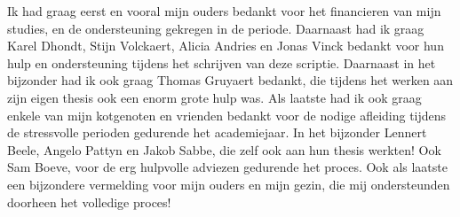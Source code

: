 Ik had graag eerst en vooral mijn ouders bedankt voor het financieren van mijn
studies, en de ondersteuning gekregen in de periode. Daarnaast had ik graag
Karel Dhondt, Stijn Volckaert, Alicia Andries en Jonas Vinck bedankt voor hun
hulp en ondersteuning tijdens het schrijven van deze scriptie. Daarnaast in het
bijzonder had ik ook graag Thomas Gruyaert bedankt, die tijdens het werken aan
zijn eigen thesis ook een enorm grote hulp was. Als laatste had ik ook graag
enkele van mijn kotgenoten en vrienden bedankt voor de nodige afleiding tijdens
de stressvolle perioden gedurende het academiejaar. In het bijzonder Lennert
Beele, Angelo Pattyn en Jakob Sabbe, die zelf ook aan hun thesis werkten! Ook
Sam Boeve, voor de erg hulpvolle adviezen gedurende het proces. Ook als laatste
een bijzondere vermelding voor mijn ouders en mijn gezin, die mij ondersteunden
doorheen het volledige proces!